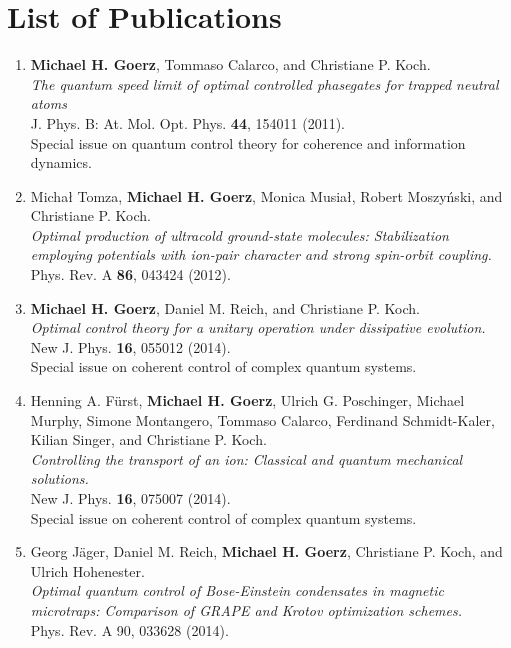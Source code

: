 \chapter{List of Publications}
\label{AppendixPubs}

\begin{enumerate}

  \item
  {\bf Michael H. Goerz}, Tommaso Calarco, and Christiane P. Koch. \\
  {\it The quantum speed limit of optimal controlled phasegates for trapped neutral atoms} \\
  J. Phys. B: At. Mol. Opt. Phys. {\bf 44}, 154011 (2011). \\
  Special issue on quantum control theory for coherence and information dynamics.

  \item
  Michał Tomza, {\bf Michael H. Goerz}, Monica Musiał, Robert Moszyński, and Christiane P. Koch. \\
  {\it Optimal production of ultracold ground-state molecules: Stabilization employing potentials with ion-pair character and strong spin-orbit coupling.}  \\
  Phys. Rev. A {\bf 86}, 043424 (2012).

  \item
  {\bf Michael H. Goerz}, Daniel M. Reich, and Christiane P. Koch. \\
  {\it Optimal control theory for a unitary operation under dissipative evolution.} \\
  New J. Phys. {\bf 16}, 055012 (2014).  \\
  Special issue on coherent control of complex quantum systems.

  \item
  Henning A. Fürst, {\bf Michael H. Goerz}, Ulrich G. Poschinger, Michael Murphy, Simone Montangero, Tommaso Calarco, Ferdinand Schmidt-Kaler, Kilian Singer, and Christiane P. Koch. \\
  {\it Controlling the transport of an ion: Classical and quantum mechanical solutions.} \\
  New J. Phys. {\bf 16}, 075007 (2014). \\
  Special issue on coherent control of complex quantum systems.

  \item
  Georg Jäger, Daniel M. Reich, {\bf Michael H. Goerz}, Christiane P. Koch, and Ulrich Hohenester. \\
  {\it Optimal quantum control of Bose-Einstein condensates in magnetic microtraps: Comparison of GRAPE and Krotov optimization schemes.} \\
  Phys. Rev. A 90, 033628 (2014).


\end{enumerate}
